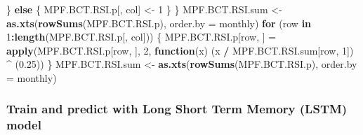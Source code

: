 \documentclass[]{article}
\newenvironment{Shaded}{\begin{snugshade}}{\end{snugshade}}
\newcommand{\ControlFlowTok}[1]{\textcolor[rgb]{0.13,0.29,0.53}{\textbf{#1}}}
\newcommand{\DataTypeTok}[1]{\textcolor[rgb]{0.13,0.29,0.53}{#1}}
\newcommand{\DecValTok}[1]{\textcolor[rgb]{0.00,0.00,0.81}{#1}}
\newcommand{\FloatTok}[1]{\textcolor[rgb]{0.00,0.00,0.81}{#1}}
\newcommand{\KeywordTok}[1]{\textcolor[rgb]{0.13,0.29,0.53}{\textbf{#1}}}
\newcommand{\NormalTok}[1]{#1}
\newcommand{\OperatorTok}[1]{\textcolor[rgb]{0.81,0.36,0.00}{\textbf{#1}}}
\newcommand{\StringTok}[1]{\textcolor[rgb]{0.31,0.60,0.02}{#1}}
\begin{document}
\begin{Shaded}
\begin{Highlighting}[]
\NormalTok{  \} }\ControlFlowTok{else}\NormalTok{ \{}
\NormalTok{    MPF.BCT.RSI.p[, col] <-}\StringTok{ }\DecValTok{1}
\NormalTok{  \}}
\NormalTok{\}}
\NormalTok{MPF.BCT.RSI.sum <-}
\StringTok{  }\KeywordTok{as.xts}\NormalTok{(}\KeywordTok{rowSums}\NormalTok{(MPF.BCT.RSI.p), }\DataTypeTok{order.by =}\NormalTok{ monthly)}
\ControlFlowTok{for}\NormalTok{ (row }\ControlFlowTok{in} \DecValTok{1}\OperatorTok{:}\KeywordTok{length}\NormalTok{(MPF.BCT.RSI.p[, col])) \{}
\NormalTok{  MPF.BCT.RSI.p[row, ] =}\StringTok{ }\KeywordTok{apply}\NormalTok{(MPF.BCT.RSI.p[row, ], }\DecValTok{2}\NormalTok{, }\ControlFlowTok{function}\NormalTok{(x)}
\NormalTok{    (x }\OperatorTok{/}\StringTok{ }\NormalTok{MPF.BCT.RSI.sum[row, }\DecValTok{1}\NormalTok{]) }\OperatorTok{^}\StringTok{ }\NormalTok{(}\FloatTok{0.25}\NormalTok{))}
\NormalTok{\}}
\NormalTok{MPF.BCT.RSI.sum <-}
\StringTok{  }\KeywordTok{as.xts}\NormalTok{(}\KeywordTok{rowSums}\NormalTok{(MPF.BCT.RSI.p), }\DataTypeTok{order.by =}\NormalTok{ monthly)}
\end{Highlighting}
\end{Shaded}

\hypertarget{train-and-predict-with-long-short-term-memory-lstm-model}{%
\subsubsection{Train and predict with Long Short Term Memory (LSTM)
model}\label{train-and-predict-with-long-short-term-memory-lstm-model}}
\end{document}
